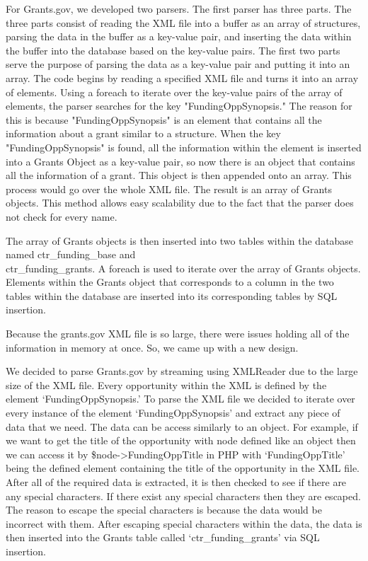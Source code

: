 \documentclass[onecolumn]{IEEEtran}
\begin{document}
For Grants.gov, we developed two parsers. The first parser has three parts. The three parts consist of reading the XML file into a buffer as an array of structures, parsing the data in the buffer as a key-value pair, and inserting the data within the buffer into the database based on the key-value pairs. The first two parts serve the purpose of parsing the data as a key-value pair and putting it into an array. The code begins by reading a specified XML file and turns it into an array of elements. Using a foreach to iterate over the key-value pairs of the array of elements, the parser searches for the key "FundingOppSynopsis." The reason for this is because "FundingOppSynopsis" is an element that contains all the information about a grant similar to a structure. When the key "FundingOppSynopsis" is found, all the information within the element is inserted into a Grants Object as a key-value pair, so now there is an object that contains all the information of a grant. This object is then appended onto an array. This process would go over the whole XML file. The result is an array of Grants objects. This method allows easy scalability due to the fact that the parser does not check for every name. 

The array of Grants objects is then inserted into two tables within the database named ctr\_funding\_base and \\ ctr\_funding\_grants. A foreach is used to iterate over the array of Grants objects. Elements within the Grants object that corresponds to a column in the two tables within the database are inserted into its corresponding tables by SQL insertion. 

Because the grants.gov XML file is so large, there were issues holding all of the information in memory at once. So, we came up with a new design.

We decided to parse Grants.gov by streaming using XMLReader due to the large size of the XML file. Every opportunity within the XML is defined by the element `FundingOppSynopsis.' To parse the XML file we decided to iterate over every instance of the element `FundingOppSynopsis' and extract any piece of data that we need. The data can be access similarly to an object. For example, if we want to get the title of the opportunity with node defined like an object then we can access it by \$node-\textgreater FundingOppTitle in PHP with `FundingOppTitle' being the defined element containing the title of the opportunity in the XML file. After all of the required data is extracted, it is then checked to see if there are any special characters. If there exist any special characters then they are escaped. The reason to escape the special characters is because the data would be incorrect with them. After escaping special characters within the data, the data is then inserted into the Grants table called `ctr\_funding\_grants' via SQL insertion.  
\end{document}
